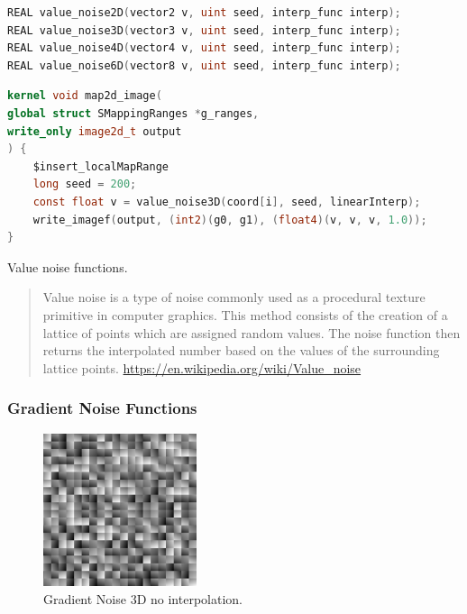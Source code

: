 \begin{lstlisting}[caption={Definition of value noise functions},label={lst:value_noise_definition},language=OpenCL]
REAL value_noise2D(vector2 v, uint seed, interp_func interp);
REAL value_noise3D(vector3 v, uint seed, interp_func interp);
REAL value_noise4D(vector4 v, uint seed, interp_func interp);
REAL value_noise6D(vector8 v, uint seed, interp_func interp);
\end{lstlisting}

\begin{lstlisting}[caption={Example for value noise functions},label={lst:value_noise_example},language=OpenCL]
kernel void map2d_image(
global struct SMappingRanges *g_ranges,
write_only image2d_t output
) {
    $insert_localMapRange
    long seed = 200;
    const float v = value_noise3D(coord[i], seed, linearInterp);
    write_imagef(output, (int2)(g0, g1), (float4)(v, v, v, 1.0));
}
\end{lstlisting}

Value noise functions.

\begin{quote}
Value noise is a type of noise commonly used as a procedural texture primitive in computer graphics.
This method consists of the creation of a lattice of points which are assigned random values.
The noise function then returns the interpolated number based on the values of the surrounding lattice points.
\url{https://en.wikipedia.org/wiki/Value_noise}
\end{quote}

\subsubsection{Gradient Noise Functions}

\begin{figure}[h]
\centering
\includegraphics[width=0.4\textwidth]{out/noise_functions/gradient_noise3D_noInterp.png}
\caption{Gradient Noise 3D no interpolation.}
\label{fig:gradient_noise3D_noInterp}
\end{figure}

